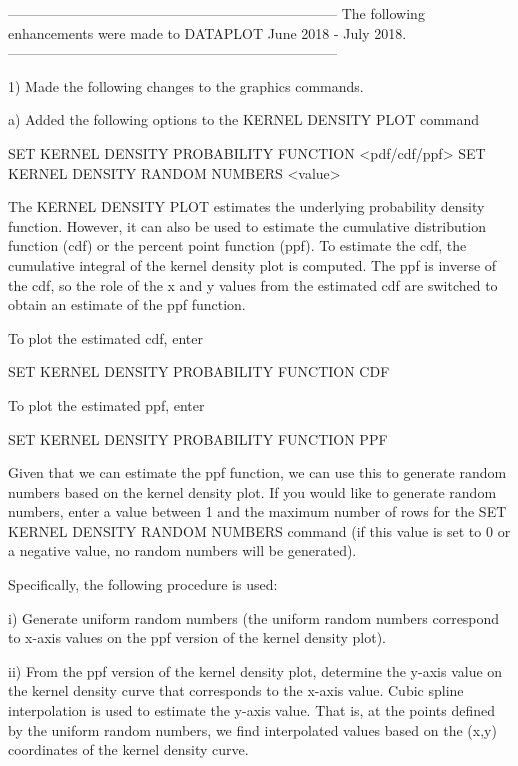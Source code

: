 -----------------------------------------------------------------------
The following enhancements were made to DATAPLOT
June 2018 - July 2018.
-----------------------------------------------------------------------

 1) Made the following changes to the graphics commands.

    a) Added the following options to the KERNEL DENSITY PLOT command

          SET KERNEL DENSITY PROBABILITY FUNCTION <pdf/cdf/ppf>
          SET KERNEL DENSITY RANDOM NUMBERS <value>

       The KERNEL DENSITY PLOT estimates the underlying probability
       density function.  However, it can also be used to estimate
       the cumulative distribution function (cdf) or the percent point
       function (ppf).  To estimate the cdf, the cumulative integral of
       the kernel density plot is computed.  The ppf is inverse of the
       cdf, so the role of the x and y values from the estimated cdf are
       switched to obtain an estimate of the ppf function.

       To plot the estimated cdf, enter
 
          SET KERNEL DENSITY PROBABILITY FUNCTION CDF

       To plot the estimated ppf, enter
 
          SET KERNEL DENSITY PROBABILITY FUNCTION PPF

    Given that we can estimate the ppf function, we can use this to
    generate random numbers based on the kernel density plot.  If you
    would like to generate random numbers, enter a value between 1 and
    the maximum number of rows for the SET KERNEL DENSITY RANDOM NUMBERS
    command (if this value is set to 0 or a negative value, no random
    numbers will be generated).

    Specifically, the following procedure is used:

        i) Generate uniform random numbers (the uniform random numbers
           correspond to x-axis values on the ppf version of the kernel
           density plot).

       ii) From the ppf version of the kernel density plot, determine
           the y-axis value on the kernel density curve that corresponds
           to the x-axis value.  Cubic spline interpolation is used to
           estimate the y-axis value.  That is, at the points defined
           by the uniform random numbers, we find interpolated values
           based on the (x,y) coordinates of the kernel density curve.

